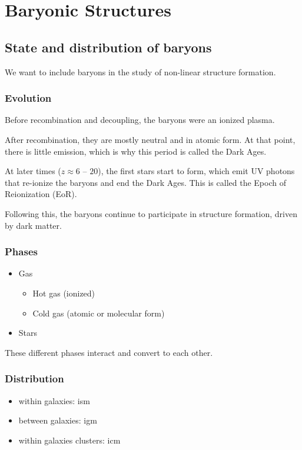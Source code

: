 \chapter{Baryonic Structures}


\section{State and distribution of baryons}


We want to include baryons in the study of non-linear structure formation.

\subsection{Evolution}
Before recombination and decoupling, the baryons were an ionized plasma.

After recombination, they are mostly neutral and in atomic form. At that point, there is little emission, which is why this period is called the Dark Ages.

At later times ($z \approx 6$ -- $20$), the first stars start to form, which emit UV photons that re-ionize the baryons and end the Dark Ages. This is called the Epoch of Reionization (EoR).

Following this, the baryons continue to participate in structure formation, driven by dark matter.


\subsection{Phases}
\begin{itemize}[nolistsep]
	\item Gas
	\begin{itemize}
		\item Hot gas (ionized)
		\item Cold gas (atomic or molecular form)
	\end{itemize}
	\item Stars
\end{itemize}
These different phases interact and convert to each other.


\subsection{Distribution}
\begin{itemize}
	\item within galaxies: \Ac{ism}
	\item between galaxies: \Ac{igm}
	\item within galaxies clusters: \Ac{icm}
\end{itemize}



